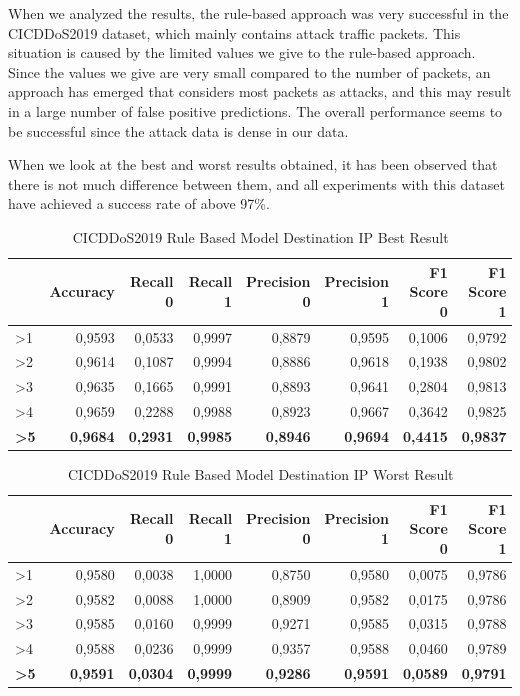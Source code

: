 \documentclass{article}
\begin{document}
When we analyzed the results, the rule-based approach was very successful in the CICDDoS2019 dataset, which mainly contains attack traffic packets. This situation is caused by the limited values we give to the rule-based approach. Since the values we give are very small compared to the number of packets, an approach has emerged that considers most packets as attacks, and this may result in a large number of false positive predictions. The overall performance seems to be successful since the attack data is dense in our data.

When we look at the best and worst results obtained, it has been observed that there is not much difference between them, and all experiments with this dataset have achieved a success rate of above 97\%.

\begin{table}
  \centering
  \caption{CICDDoS2019 Rule Based Model Destination IP Best Result}
  \label{cicddos2019-rule-based-dst-ip-best}
  \begin{tabular}{lrrrrrrr}
    \toprule
	{Rule & Accuracy & Recall 0 & Recall 1 & Precision 0 & Precision 1 & F1 Score 0 & F1 Score 1} \\
	\midrule
        >1 & 0,9593 & 0,0533 & 0,9997 & 0,8879 & 0,9595 & 0,1006 & 0,9792 \\ \hline
        >2 & 0,9614 & 0,1087 & 0,9994 & 0,8886 & 0,9618 & 0,1938 & 0,9802 \\ \hline
        >3 & 0,9635 & 0,1665 & 0,9991 & 0,8893 & 0,9641 & 0,2804 & 0,9813 \\ \hline
        >4 & 0,9659 & 0,2288 & 0,9988 & 0,8923 & 0,9667 & 0,3642 & 0,9825 \\ \hline
        \textbf{>5} & \textbf{0,9684} & \textbf{0,2931} & \textbf{0,9985} & \textbf{0,8946} & \textbf{0,9694} & \textbf{0,4415} & \textbf{0,9837} \\
	\bottomrule
  \end{tabular}
\end{table}

\begin{table}
  \centering
  \caption{CICDDoS2019 Rule Based Model Destination IP Worst Result}
  \label{cicddos2019-rule-based-dst-ip-worst}
  \begin{tabular}{lrrrrrrr}
    \toprule
	{Rule & Accuracy & Recall 0 & Recall 1 & Precision 0 & Precision 1 & F1 Score 0 & F1 Score 1} \\
	\midrule
        >1 & 0,9580 & 0,0038 & 1,0000 & 0,8750 & 0,9580 & 0,0075 & 0,9786 \\ \hline
        >2 & 0,9582 & 0,0088 & 1,0000 & 0,8909 & 0,9582 & 0,0175 & 0,9786 \\ \hline
        >3 & 0,9585 & 0,0160 & 0,9999 & 0,9271 & 0,9585 & 0,0315 & 0,9788 \\ \hline
        >4 & 0,9588 & 0,0236 & 0,9999 & 0,9357 & 0,9588 & 0,0460 & 0,9789 \\ \hline
        \textbf{>5} & \textbf{0,9591} & \textbf{0,0304} & \textbf{0,9999} & \textbf{0,9286} & \textbf{0,9591} & \textbf{0,0589} & \textbf{0,9791} \\ 
	\bottomrule
  \end{tabular}
\end{table}
\end{document}
